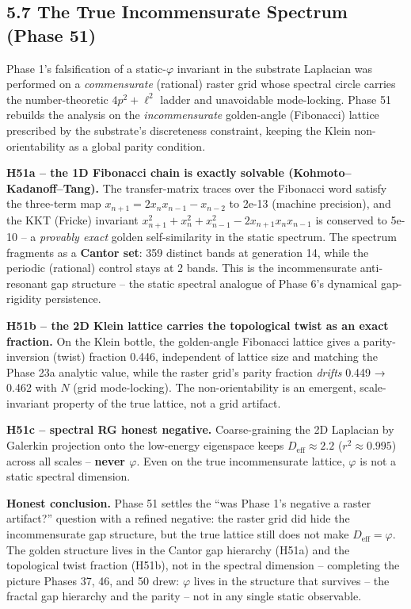 \documentclass[
  11pt,
]{article}
\begin{document}
\subsection{5.7 The True Incommensurate Spectrum (Phase
51)}\label{the-true-incommensurate-spectrum-phase-51}

Phase 1's falsification of a static-\(\varphi\) invariant in the
substrate Laplacian was performed on a \emph{commensurate} (rational)
raster grid whose spectral circle carries the number-theoretic
\(4p^2 + \ell^2\) ladder and unavoidable mode-locking. Phase 51 rebuilds
the analysis on the \emph{incommensurate} golden-angle (Fibonacci)
lattice prescribed by the substrate's discreteness constraint, keeping
the Klein non-orientability as a global parity condition.

\textbf{H51a -- the 1D Fibonacci chain is exactly solvable
(Kohmoto--Kadanoff--Tang).} The transfer-matrix traces over the
Fibonacci word satisfy the three-term map
\(x_{n+1} = 2x_n x_{n-1} - x_{n-2}\) to 2e-13 (machine precision), and
the KKT (Fricke) invariant
\(x_{n+1}^2 + x_n^2 + x_{n-1}^2 - 2x_{n+1}x_n x_{n-1}\) is conserved to
5e-10 -- a \emph{provably exact} golden self-similarity in the static
spectrum. The spectrum fragments as a \textbf{Cantor set}: 359 distinct
bands at generation 14, while the periodic (rational) control stays at 2
bands. This is the incommensurate anti-resonant gap structure -- the
static spectral analogue of Phase 6's dynamical gap-rigidity
persistence.

\textbf{H51b -- the 2D Klein lattice carries the topological twist as an
exact fraction.} On the Klein bottle, the golden-angle Fibonacci lattice
gives a parity-inversion (twist) fraction 0.446, independent of lattice
size and matching the Phase 23a analytic value, while the raster grid's
parity fraction \emph{drifts} 0.449 → 0.462 with \(N\) (grid
mode-locking). The non-orientability is an emergent, scale-invariant
property of the true lattice, not a grid artifact.

\textbf{H51c -- spectral RG honest negative.} Coarse-graining the 2D
Laplacian by Galerkin projection onto the low-energy eigenspace keeps
\(D_{\text{eff}} \approx 2.2\) (\(r^2 \approx 0.995\)) across all scales
-- \textbf{never \(\varphi\)}. Even on the true incommensurate lattice,
\(\varphi\) is not a static spectral dimension.

\textbf{Honest conclusion.} Phase 51 settles the ``was Phase 1's
negative a raster artifact?'' question with a refined negative: the
raster grid did hide the incommensurate gap structure, but the true
lattice still does not make \(D_{\text{eff}} = \varphi\). The golden
structure lives in the Cantor gap hierarchy (H51a) and the topological
twist fraction (H51b), not in the spectral dimension -- completing the
picture Phases 37, 46, and 50 drew: \(\varphi\) lives in the structure
that survives -- the fractal gap hierarchy and the parity -- not in any
single static observable.
\end{document}
